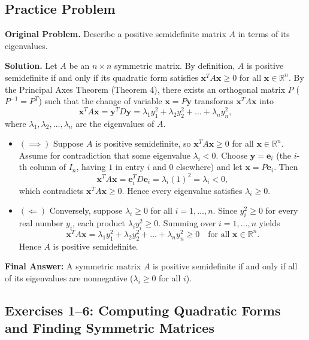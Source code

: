 \documentclass[11pt, letterpaper]{article}
\theoremstyle{definition}
\theoremstyle{remark}
\newcommand{\R}{\mathbb{R}}
\begin{document}
\subsection{Practice Problem}

\textbf{Original Problem.} Describe a positive semidefinite matrix $A$ in terms of its eigenvalues.

\textbf{Solution.}
Let $A$ be an $n \times n$ symmetric matrix. By definition, $A$ is positive semidefinite if and only if its quadratic form satisfies $\mathbf{x}^T A \mathbf{x} \ge 0$ for all $\mathbf{x} \in \R^n$. By the Principal Axes Theorem (Theorem 4), there exists an orthogonal matrix $P$ ($P^{-1} = P^T$) such that the change of variable $\mathbf{x} = P\mathbf{y}$ transforms $\mathbf{x}^T A \mathbf{x}$ into
\[
\mathbf{x}^T A \mathbf{x} = \mathbf{y}^T D \mathbf{y} = \lambda_1 y_1^2 + \lambda_2 y_2^2 + \dots + \lambda_n y_n^2,
\]
where $\lambda_1, \lambda_2, \dots, \lambda_n$ are the eigenvalues of $A$.

\begin{itemize}
    \item $(\implies)$ Suppose $A$ is positive semidefinite, so $\mathbf{x}^T A \mathbf{x} \ge 0$ for all $\mathbf{x} \in \R^n$. Assume for contradiction that some eigenvalue $\lambda_i < 0$. Choose $\mathbf{y} = \mathbf{e}_i$ (the $i$-th column of $I_n$, having $1$ in entry $i$ and $0$ elsewhere) and let $\mathbf{x} = P\mathbf{e}_i$. Then
    \[
    \mathbf{x}^T A \mathbf{x} = \mathbf{e}_i^T D \mathbf{e}_i = \lambda_i (1)^2 = \lambda_i < 0,
    \]
    which contradicts $\mathbf{x}^T A \mathbf{x} \ge 0$. Hence every eigenvalue satisfies $\lambda_i \ge 0$.
    \item $(\Longleftarrow)$ Conversely, suppose $\lambda_i \ge 0$ for all $i = 1, \dots, n$. Since $y_i^2 \ge 0$ for every real number $y_i$, each product $\lambda_i y_i^2 \ge 0$. Summing over $i = 1, \dots, n$ yields
    \[
    \mathbf{x}^T A \mathbf{x} = \lambda_1 y_1^2 + \lambda_2 y_2^2 + \dots + \lambda_n y_n^2 \ge 0 \quad \text{for all } \mathbf{x} \in \R^n.
    \]
    Hence $A$ is positive semidefinite.
\end{itemize}

\textbf{Final Answer:} A symmetric matrix $A$ is positive semidefinite if and only if all of its eigenvalues are nonnegative ($\lambda_i \ge 0$ for all $i$).

\subsection{Exercises 1--6: Computing Quadratic Forms and Finding Symmetric Matrices}
\end{document}
